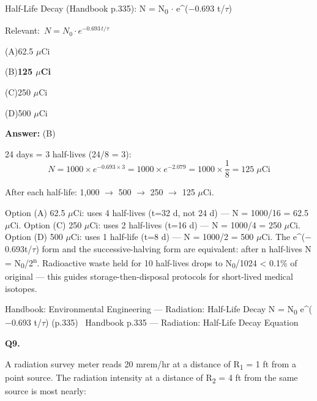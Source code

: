 \documentclass[11pt]{article}
\newcommand{\correct}[1]{\textbf{#1}\;{\color{accent}$\checkmark$}}
\newcommand{\optline}[2]{\par\noindent\hspace{1.2em}(#1)\hspace{0.6em}#2}
\begin{document}
Half-Life Decay (Handbook p.335):
N = N\textsubscript{0} $\cdot$ e\textasciicircum{}($-$0.693 t/$\tau$)\par\vspace{3pt}
{\small\color{soft}Relevant:}\ $N = N_0 \cdot e^{-0.693\, t/\tau}$\par\vspace{3pt}
\optline{A}{62.5 $\mu$Ci}
\optline{B}{\correct{125 $\mu$Ci}}
\optline{C}{250 $\mu$Ci}
\optline{D}{500 $\mu$Ci}
\par\vspace{3pt}
\vspace{2pt}\par\noindent\colorbox{boxbg}{\parbox{\dimexpr\linewidth-2\fboxsep\relax}{%
\vspace{2pt}\textbf{Answer:} (B)\par\vspace{2pt}
{\small 24 days = 3 half-lives (24/8 = 3):
\[N = 1000 \times e^{-0.693 \times 3} = 1000 \times e^{-2.079} = 1000 \times \frac{1}{8} = 125\;\mu\text{Ci}\]

After each half-life: 1,000 $\rightarrow$ 500 $\rightarrow$ 250 $\rightarrow$ 125 $\mu$Ci.

Option (A) 62.5 $\mu$Ci: uses 4 half-lives (t=32 d, not 24 d) --- N = 1000/16 = 62.5 $\mu$Ci. Option (C) 250 $\mu$Ci: uses 2 half-lives (t=16 d) --- N = 1000/4 = 250 $\mu$Ci. Option (D) 500 $\mu$Ci: uses 1 half-life (t=8 d) --- N = 1000/2 = 500 $\mu$Ci. The e\textasciicircum{}($-$0.693t/$\tau$) form and the successive-halving form are equivalent: after n half-lives N = N\textsubscript{0}/2\textsuperscript{n}. Radioactive waste held for 10 half-lives drops to N\textsubscript{0}/1024 < 0.1\% of original --- this guides storage-then-disposal protocols for short-lived medical isotopes.}\par\vspace{2pt}
{\footnotesize\color{soft}Handbook: Environmental Engineering --- Radiation: Half-Life Decay N = N\textsubscript{0} e\textasciicircum{}($-$0.693 t/$\tau$) (p.335) \textbullet\ Handbook p.335 --- Radiation: Half-Life Decay Equation}\vspace{2pt}
}}
\vspace{9pt}
\filbreak
\textbf{\color{accent}Q9.}\par\vspace{2pt}
A radiation survey meter reads 20 mrem/hr at a distance of R\textsubscript{1} = 1 ft from a point source. The radiation intensity at a distance of R\textsubscript{2} = 4 ft from the same source is most nearly:
\end{document}
